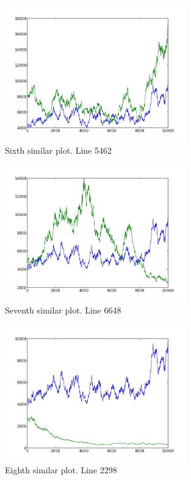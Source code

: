 \begin{figure}[h!]
    \centering
    \includegraphics[width=0.7\textwidth]{images/5462.png}
    \caption{Sixth similar plot.  Line 5462}
    \label{fig:ex1_6}
\end{figure}

\begin{figure}[h!]
    \centering
    \includegraphics[width=0.7\textwidth]{images/6648.png}
    \caption{Seventh similar plot.  Line 6648}
    \label{fig:ex1_7}
\end{figure}

\begin{figure}[h!]
    \centering
    \includegraphics[width=0.7\textwidth]{images/2298.png}
    \caption{Eighth similar plot.  Line 2298}
    \label{fig:ex1_8}
\end{figure}

